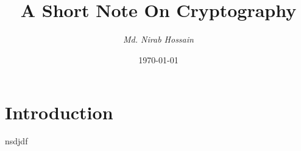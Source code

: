 \documentclass[a4paper,11pt]{article}
\newcommand{\B}{\color{blue}}
\newcommand{\Gr}{\color{gray}}
\newcommand{\A}{ \author{\it\Gr Md. Nirab Hossain}}
\newcommand{\C}{\title}
\newcommand{\D}{\date{\today} \maketitle}
\begin{document}
	\C{\bf\B\Huge\\A Short Note On Cryptography} \A \D
\section{Introduction}
nsdjdf
\end{document}
